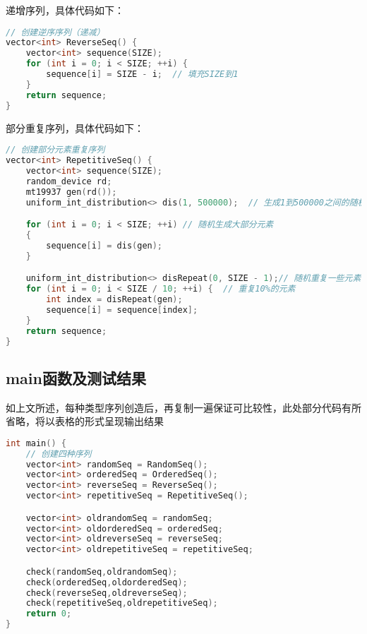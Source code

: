 \documentclass[fontset=fandol]{ctexart}
\begin{document}
递增序列，具体代码如下：
\begin{lstlisting}[language=C++, caption={ReverseSeq()函数}]  
// 创建逆序序列（递减）
vector<int> ReverseSeq() {
    vector<int> sequence(SIZE);
    for (int i = 0; i < SIZE; ++i) {
        sequence[i] = SIZE - i;  // 填充SIZE到1
    }
    return sequence;
}
\end{lstlisting}

部分重复序列，具体代码如下：
\begin{lstlisting}[language=C++, caption={RepetitiveSeq()函数}]  
// 创建部分元素重复序列
vector<int> RepetitiveSeq() {
    vector<int> sequence(SIZE);
    random_device rd;
    mt19937 gen(rd());
    uniform_int_distribution<> dis(1, 500000);  // 生成1到500000之间的随机数

    for (int i = 0; i < SIZE; ++i) // 随机生成大部分元素
    {
        sequence[i] = dis(gen);
    }

    uniform_int_distribution<> disRepeat(0, SIZE - 1);// 随机重复一些元素
    for (int i = 0; i < SIZE / 10; ++i) {  // 重复10%的元素
        int index = disRepeat(gen);
        sequence[i] = sequence[index];
    }
    return sequence;
}

\end{lstlisting}

\subsection{main函数及测试结果}

如上文所述，每种类型序列创造后，再复制一遍保证可比较性，此处部分代码有所省略，将以表格的形式呈现输出结果
\begin{lstlisting}[language=C++, caption={main()}]  
int main() {
    // 创建四种序列
    vector<int> randomSeq = RandomSeq();
    vector<int> orderedSeq = OrderedSeq();
    vector<int> reverseSeq = ReverseSeq();
    vector<int> repetitiveSeq = RepetitiveSeq();

    vector<int> oldrandomSeq = randomSeq;
    vector<int> oldorderedSeq = orderedSeq;
    vector<int> oldreverseSeq = reverseSeq;
    vector<int> oldrepetitiveSeq = repetitiveSeq;

    check(randomSeq,oldrandomSeq);
    check(orderedSeq,oldorderedSeq);
    check(reverseSeq,oldreverseSeq);
    check(repetitiveSeq,oldrepetitiveSeq);
    return 0;
}

\end{lstlisting}
\end{document}
